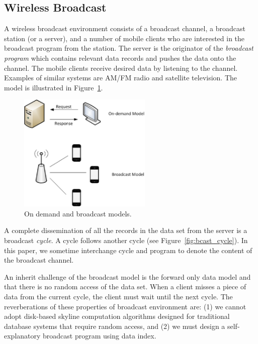 \subsection{Wireless Broadcast}\label{sec:wireless_broadcast}
A wireless broadcast environment consists of a broadcast channel,
a broadcast station (or a server), and a number of mobile clients
who are interested in the broadcast program from the station. The
server is the originator of the \emph{broadcast program} which
contains relevant data records and pushes the data onto the
channel. The mobile clients receive desired data by listening to
the channel. Examples of similar systems are AM/FM radio and
satellite television. The model is illustrated in
Figure~\ref{fig:broadcast}.

\begin{figure}[h]
\begin{center}
\includegraphics[width=2.5in]{Figures/on_demand.eps}
\caption{\small On demand and broadcast
models.\label{fig:broadcast}}
\end{center}
\end{figure}

A complete dissemination of all the records in the data set from
the server is a broadcast \emph{cycle}. A cycle follows another
cycle (see Figure~\ref{fig:bcast_cycle}). In this paper, we
sometime interchange cycle and program to denote the content of
the broadcast channel.

An inherit challenge of the broadcast model is the forward only
data model and that there is no random access of the data set.
When a client misses a piece of data from the current cycle, the
client must wait until the next cycle. The reverberations of these
properties of broadcast environment are: (1) we cannot adopt
disk-based skyline computation algorithms designed for traditional
database systems that require random access, and (2) we must
design a self-explanatory broadcast program using data index.


